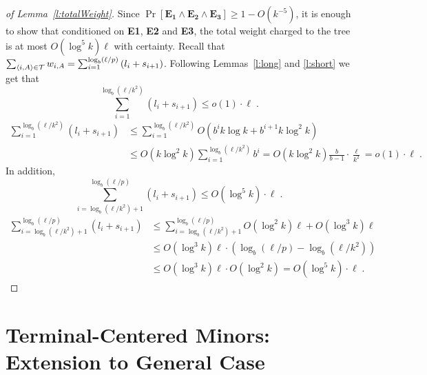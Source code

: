\documentclass[twoside,leqno,twocolumn]{article}
\newcommand{\proofof}[1]{of #1}
\newcommand{\proofof}[1]{Proof of #1}
\renewcommand{\qedhere}{}
\begin{document}
\begin{proof}[\proofof{Lemma~\ref{l:totalWeight}}]
Since $\Pr[\mathbf{E_1} \wedge \mathbf{E_2} \wedge \mathbf{E_3}] \ge 1-O(k^{-5})$, it is enough to show that conditioned on {\bf E1}, {\bf E2} and {\bf E3}, the total weight charged to the tree is at most $O(\log ^5 k) \ell$ with certainty.
Recall that $\sum_{\langle i,A \rangle \in {\cal T}}{w_{i,A}} = \sum_{i=1}^{\log_b (\ell/p)}{(l_i+s_{i+1})}$. Following Lemmas~\ref{l:long} and \ref{l:short} we get that
\ifprocs
\begin{equation*}
\sum_{i=1}^{\log_b (\ell/k^2)}{(l_i+s_{i+1})} \le o(1) \cdot \ell \;.
\end{equation*}
\else
\begin{equation*}
\begin{split}
\sum_{i=1}^{\log_b (\ell/k^2)}{(l_i+s_{i+1})} &\le \sum_{i=1}^{\log_b (\ell/k^2)}{O( b^{i} k \log k + b^{i+1} k\log^2 k)} \\
&\le O(k \log^2 k)\sum_{i=1}^{\log_b (\ell/k^2)}{b^i} = O(k \log^2 k) \frac{b}{b-1} \cdot \frac{\ell}{k^2} = o(1) \cdot \ell \;.
\end{split}
\end{equation*}
\fi
In addition,
\ifprocs
\begin{equation*}
\sum_{i=\log_b (\ell/k^2) + 1}^{\log_b (\ell/p)}{(l_i+s_{i+1})} \le O(\log^5 k) \cdot \ell \;.
\end{equation*}
\else
\begin{align*}
\sum_{i=\log_b (\ell/k^2) + 1}^{\log_b (\ell/p)}{(l_i+s_{i+1})} &\le \sum_{i=\log_b (\ell/k^2) + 1}^{\log_b (\ell/p)}{O(\log^2k) \ell + O(\log^3k) \ell} \\
&\le O(\log^3 k) \ell \cdot (\log_b(\ell/p) - \log_b(\ell/k^2)) \\
&\le O(\log^3 k) \ell \cdot O(\log^2k)  = O(\log^5 k) \cdot \ell \;.
\qedhere
\end{align*}
\fi
\end{proof}


\section{Terminal-Centered Minors: Extension to General Case}\label{sec:proofDiscard}
\end{document}
